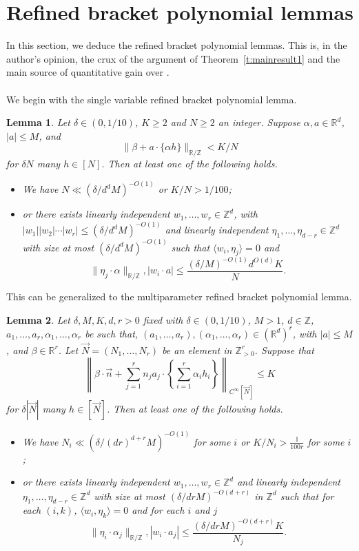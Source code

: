 \documentclass[11pt, a4paper]{amsart}
\theoremstyle{plain}
\theoremstyle{plain}
\newtheorem{lemma}{Lemma}
\theoremstyle{definition}
\theoremstyle{remark}
\numberwithin{equation}{section}
\numberwithin{lemma}{section}
\numberwithin{proposition}{section}
\numberwithin{corollary}{section}
\numberwithin{definition}{section}
\numberwithin{claim}{section}
\begin{document}
\section{Refined bracket polynomial lemmas}\label{s:refbrack}
In this section, we deduce the refined bracket polynomial lemmas. This is, in the author's opinion, the crux of the argument of Theorem~\ref{t:mainresult1} and the main source of quantitative gain over \cite{GT12}. \\\\
We begin with the single variable refined bracket polynomial lemma.
\begin{lemma}\label{l:refined1}
Let $\delta \in (0, 1/10)$, $K \ge 2$ and $N \ge 2$ an integer. Suppose $\alpha, a \in \mathbb{R}^{d}$, $|a| \le M$, and
    $$\|\beta + a \cdot \{\alpha h\}\|_{\mathbb{R}/\mathbb{Z}} < K/N$$
    for $\delta N$ many $h \in [N]$. Then at least one of the following holds.
    \begin{itemize}
        \item We have $N \ll (\delta/d^{d}M)^{-O(1)}$ or $K/N > 1/100$;
        \item or there exists linearly independent $w_1, \dots, w_r \in \mathbb{Z}^d$, with $|w_1||w_2| \cdots |w_r| \le (\delta/d^{d} M)^{-O(1)}$ and linearly independent $\eta_1, \dots, \eta_{d - r} \in \mathbb{Z}^{d}$ with size at most $(\delta/d^{d} M)^{-O(1)}$ such that $\langle w_i, \eta_j \rangle = 0$ and
        $$\|\eta_j \cdot \alpha\|_{\mathbb{R}/\mathbb{Z}}, |w_i \cdot a| \le \frac{(\delta/M)^{-O(1)}d^{O(d)}K}{N}.$$
    \end{itemize}
\end{lemma}
This can be generalized to the multiparameter refined bracket polynomial lemma.
\begin{lemma}\label{l:refined2}
Let $\delta, M, K, d, r > 0$ fixed with $\delta \in (0, 1/10)$, $M > 1$, $d \in \mathbb{Z}$, $a_1, \dots, a_r, \alpha_1, \dots, \alpha_r$ be such that, $(a_1, \dots, a_r), (\alpha_1, \dots, \alpha_r) \in (\mathbb{R}^d)^r$, with $|a| \le M$, and $\beta \in \mathbb{R}^r$. Let $\vec{N} = (N_1, \dots, N_r)$ be an element in $\mathbb{Z}^r_{>0}$. Suppose that
$$\left\|\beta \cdot \vec{n} +  \sum_{j = 1}^r n_j a_j \cdot \left\{\sum_{i = 1}^r \alpha_i h_i\right\}\right\|_{C^\infty[\vec{N}]} \le K$$
    for $\delta |\vec{N}|$ many $h \in [\vec{N}]$. Then at least one of the following holds.
    \begin{itemize}
        \item We have $N_i \ll (\delta/(dr)^{d + r}M)^{-O(1)}$ for some $i$ or $K/N_i > \frac{1}{100r}$ for some $i$;
        \item or there exists linearly independent $w_1, \dots, w_r \in \mathbb{Z}^d$ and linearly independent $\eta_1, \dots, \eta_{d - r} \in \mathbb{Z}^{d}$ with size at most $(\delta/drM)^{-O(d + r)}$ in $\mathbb{Z}^{d}$ such that for each $(i, k)$, $\langle w_i, \eta_k \rangle = 0$ and for each $i$ and $j$
    $$\|\eta_i \cdot \alpha_j\|_{\mathbb{R}/\mathbb{Z}}, |w_i \cdot a_j| \le \frac{(\delta/drM)^{-O(d + r)}K}{N_j}.$$
    \end{itemize}
\end{lemma}
\end{document}
